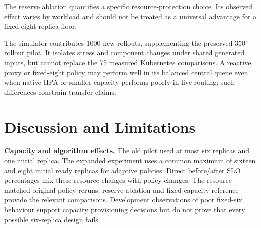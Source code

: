 \documentclass[10pt,twocolumn,a4paper]{article}
\begin{document}
The reserve ablation quantifies a specific resource-protection choice. Its observed effect varies by workload and should not be treated as a universal advantage for a fixed eight-replica floor.

\begin{table}[t]\centering\small\setlength{\tabcolsep}{3pt}
\caption{Independent-plant means across 25 paired seeds per regime. All ablation columns show violation percentages. The central queue omits Kubernetes routing and CFS details, so these values are not live-cluster outcomes. Full eight-policy scores are retained in the artifact.}\label{tab:simulation}
\ifdim\wd\databox>\columnwidth\relax\resizebox{\columnwidth}{!}{\usebox{\databox}}\else\usebox{\databox}\fi
\end{table}

The simulator contributes 1000 new rollouts, supplementing the preserved 350-rollout pilot. It isolates stress and component changes under shared generated inputs, but cannot replace the 75 measured Kubernetes comparisons. A reactive proxy or fixed-eight policy may perform well in its balanced central queue even when native HPA or smaller capacity performs poorly in live routing; such differences constrain transfer claims.



\section{Discussion and Limitations}
\textbf{Capacity and algorithm effects.} The old pilot used at most six replicas and one initial replica. The expanded experiment uses a common maximum of sixteen and eight initial ready replicas for adaptive policies. Direct before/after SLO percentages mix these resource changes with policy changes. The resource-matched original-policy reruns, reserve ablation and fixed-capacity reference provide the relevant comparisons. Development observations of poor fixed-six behaviour support capacity provisioning decisions but do not prove that every possible six-replica design fails.
\end{document}
